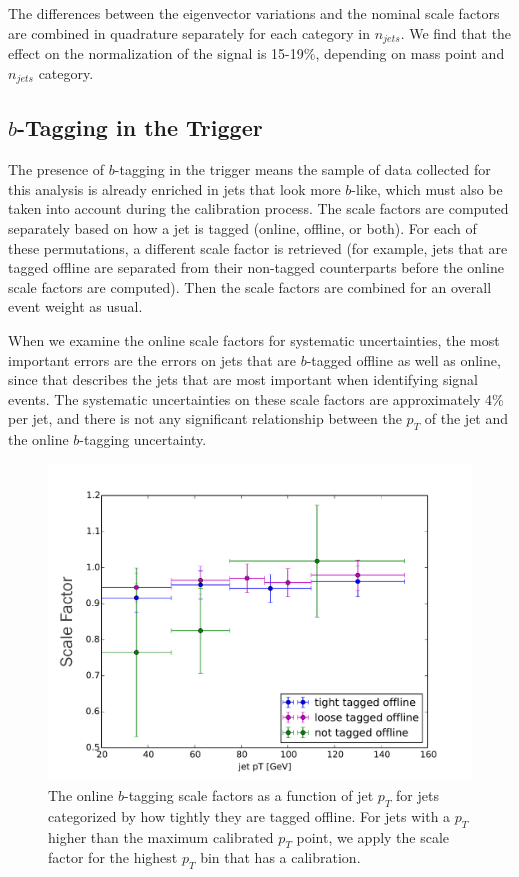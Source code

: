 The differences between the eigenvector variations and the nominal scale factors
are combined in quadrature separately for each category in $n_{jets}$.  We find that
the effect on the normalization of the signal is 15-19\%, depending on mass point and
$n_{jets}$ category.


\subsection{$b$-Tagging in the Trigger}
The presence of $b$-tagging in the trigger means the sample of data collected for this 
analysis is already enriched in jets that look more $b$-like, which must also 
be taken into account during the calibration process.  The scale factors
are computed separately based on how a jet is tagged (online, offline, or both). 
For each of these permutations, a different scale factor is retrieved (for
example, jets that are tagged offline are separated from their non-tagged counterparts
before the online scale factors are computed).  Then the scale factors are combined
for an overall event weight as usual.  

When we examine the online scale factors for systematic uncertainties, the most
important errors are the errors on jets that are $b$-tagged offline as well as online,
since that describes the jets that are most important when identifying signal events. 
The systematic uncertainties on these scale factors are approximately 4\% per jet, 
and there is not any significant relationship between the $p_T$ of the jet
and the online $b$-tagging uncertainty.  

\begin{figure}
    \center
  \includegraphics[width=0.85\linewidth]{Systematics/online_SFs.pdf}
  \caption{The online $b$-tagging scale factors as a function of jet $p_T$ for
  jets categorized by how tightly they are tagged offline.  For jets with a $p_T$
  higher than the maximum calibrated $p_T$ point, we apply the scale factor for the 
  highest $p_T$ bin that has a calibration. \label{fig:online_sfs}}    
\end{figure}                                                                                                                        












